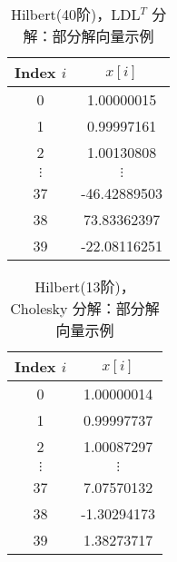 \documentclass[UTF8]{ctexart}
\begin{document}
  \begin{table}[ht]
  \centering
  \caption{Hilbert(40阶)，LDL$^T$ 分解：部分解向量示例}
  \label{tab:hilbert40-LDLT}
  \begin{tabular}{cc}
  \toprule
  \textbf{Index} $i$ & $x[i]$ \\
  \midrule
  0   &  1.00000015  \\
  1   &  0.99997161  \\
  2   &  1.00130808  \\
  $\vdots$ & $\vdots$ \\
  37  & -46.42889503 \\
  38  &  73.83362397 \\
  39  &  -22.08116251 \\
  \bottomrule
  \end{tabular}
  \end{table}


  \begin{table}[ht]
    \centering
    \caption{Hilbert(13阶)，Cholesky 分解：部分解向量示例}
    \label{tab:hilbert13-cholesky}
    \begin{tabular}{cc}
    \toprule
    \textbf{Index} $i$ & $x[i]$ \\
    \midrule
    0   &  1.00000014 \\
    1   &  0.99997737  \\
    2   &  1.00087297  \\
    $\vdots$ & $\vdots$ \\
    37  & 7.07570132\\
    38  &  -1.30294173\\
    39  &  1.38273717\\
    \bottomrule
    \end{tabular}
    \end{table}
  
\end{document}
